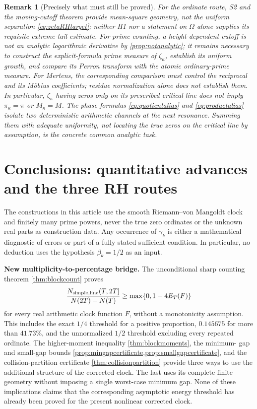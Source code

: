 \documentclass[11pt,reqno]{amsart}
\numberwithin{equation}{section}
\newtheorem{remark}[theorem]{Remark}
\begin{document}
\begin{remark}[Precisely what must still be proved]
\label{rem:unresolvedbridges}
For the ordinate route, S2 and the moving-cutoff theorem provide
mean-square geometry, not the uniform separation
\eqref{eq:zetaRHtarget}; neither H1 nor a statement on $\Omega$
alone supplies its requisite extreme-tail estimate.
For prime counting, a height-dependent cutoff is not an
analytic logarithmic derivative by \cref{prop:notanalytic};
it remains necessary to construct the explicit-formula prime
measure of $\zeta_\kappa$, establish its uniform growth, and
compare its Perron transform with the \emph{atomic ordinary-prime}
measure. For Mertens, the corresponding comparison must control
the reciprocal and its Möbius coefficients; residue normalization
alone does not establish them. In particular,
$\zeta_\kappa$ having zeros only on its prescribed critical
line does not imply $\pi_\kappa=\pi$ or $M_\kappa=M$.
The phase formulas \eqref{eq:quotientalias} and
\eqref{eq:productalias} isolate two deterministic arithmetic
channels at the next resonance. Summing them with adequate
uniformity, not locating the true zeros on the critical line
by assumption, is the concrete common analytic task.
\end{remark}


\section{Conclusions: quantitative advances and the three RH routes}
\label{sec:conclusions}
The constructions in this article use the smooth Riemann--von Mangoldt
clock and finitely many prime powers, never the true zero ordinates or
the unknown real parts as construction data.  Any occurrence of
$\gamma_k$ is either a mathematical diagnostic of errors or part of a
fully stated sufficient condition.  In particular, no deduction uses
the hypothesis $\beta_k=1/2$ as an input.

\medskip
\noindent\textbf{New multiplicity-to-percentage bridge.}
The unconditional sharp counting theorem \cref{thm:blockcount} proves
\[
  \frac{N_{\rm simple,line}(T,2T]}{N(2T)-N(T)}
  \ge \max\{0,1-4E_T(F)\}
\]
for every real arithmetic clock function $F$, without a monotonicity
assumption.  This includes the exact $1/4$ threshold for a positive
proportion, $0.145675$ for more than $41.73\%$, and the
unnormalized $1/2$ threshold excluding every repeated ordinate.
The higher-moment inequality \cref{thm:blockmoments}, the minimum-
gap and small-gap bounds \cref{prop:mingapcertificate,prop:smallgapcertificate},
and the collision-partition certificate \cref{thm:collisionpartition}
provide three ways to use the additional structure of the corrected
clock.  The last uses its complete finite geometry without imposing a
single worst-case minimum gap.  None of these implications claims
that the corresponding asymptotic energy threshold has already been
proved for the present nonlinear corrected clock.
\end{document}
